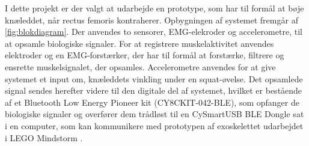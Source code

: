 I dette projekt er der valgt at udarbejde en prototype, som har til formål at bøje knæleddet, når rectus femoris kontraherer. Opbygningen af systemet fremgår af \autoref{fig:blokdiagram}. Der anvendes to sensorer, EMG-elekroder og accelerometre, til at opsamle biologiske signaler. For at registrere muskelaktivitet anvendes elektroder og en EMG-forstærker, der har til formål at forstærke, filtrere og ensrette muskelsignalet, der opsamles. Accelerometre anvendes for at give systemet et input om, knæleddets vinkling  under en squat-øvelse. Det opsamlede signal sendes herefter videre til den digitale del af systemet, hvilket er bestående af et Bluetooth Low Energy Pioneer kit (CY8CKIT-042-BLE), som opfanger de biologiske signaler og overfører dem trådløst til en CySmartUSB BLE Dongle sat i en computer, som kan kommunikere med prototypen af exoskelettet udarbejdet i LEGO Mindstorm . 


